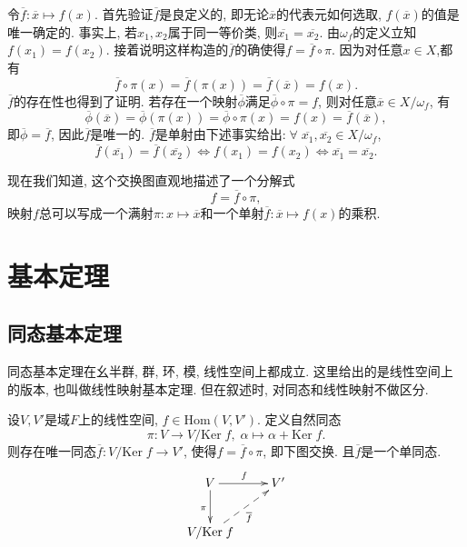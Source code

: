 \documentclass[color=green,mathpazo,titlestyle=hang]{elegantbook}
\begin{document}
\newpage
\begin{newproof}
	令$\overline{f}:\overline{x}\longmapsto f(x)$. 首先验证$\overline{f}$是良定义的, 即无论$\overline{x}$的代表元如何选取, $f(\overline{x})$的值是唯一确定的. 事实上, 若$x_1,x_2$属于同一等价类, 则$\overline{x_1}=\overline{x_2}$. 由$\omega_f$的定义立知$f(x_1)=f(x_2)$. 接着说明这样构造的$\overline{f}$的确使得$f=\overline{f}\circ \pi$. 因为对任意$x\in X$,都有
	\[
	\overline{f}\circ \pi(x)=\overline{f}(\pi(x))=\overline{f}(\overline{x})=f(x).
	\]
	$\overline{f}$的存在性也得到了证明. 若存在一个映射$\overline{\phi}$满足$\overline{\phi}\circ \pi=f$, 则对任意$\overline{x}\in X/\omega_f$, 有
	\[
	\overline{\phi}(\overline{x})=\overline{\phi}(\pi(x))=\overline{\phi}\circ \pi(x)=f(x)=\overline{f}(\overline{x}),
	\]
	即$\overline{\phi}=\overline{f}$, 因此$\overline{f}$是唯一的. $\overline{f}$是单射由下述事实给出:$\;\forall\;\overline{x_1},\overline{x_2}\in X/\omega_f$, 
	\[
	\overline{f}(\overline{x_1})=\overline{f}(\overline{x_2})\iff
	f(x_1)=f(x_2)\iff \overline{x_1}=\overline{x_2}.
	\] 
\end{newproof}

现在我们知道, 这个交换图直观地描述了一个分解式
\begin{equation}
	f=\overline{f}\circ \pi,
\end{equation}
映射$f$总可以写成一个满射$\pi:x\longmapsto\overline{x}$和一个单射$\overline{f}:\overline{x}\longmapsto f(x)$的乘积.

\section{基本定理}
\subsection{同态基本定理}
同态基本定理在幺半群, 群, 环, 模, 线性空间上都成立. 这里给出的是线性空间上的版本, 也叫做线性映射基本定理. 但在叙述时, 对同态和线性映射不做区分.

\begin{newthem}
	设$V,V'$是域$F$上的线性空间, $f\in\mathrm{Hom}(V,V')$. 定义自然同态
	\[\pi:V\longrightarrow V/\mathrm{Ker}\;f,\;\alpha\longmapsto \alpha+\mathrm{Ker}\;f.\] 
	则存在唯一同态$\overline{f}:V/\mathrm{Ker}\;f\longrightarrow V'$, 使得$f=\overline{f}\circ\pi$, 即下图交换. 且$\overline{f}$是一个单同态.
	\[\xymatrix{
		V\ar[d]_{\pi}\ar[r]^{f} & V' \\
		V/\mathrm{Ker}\;f \ar@{-->}[ur]_{\overline{f}} &  
	}\]
\end{newthem}
\end{document}
